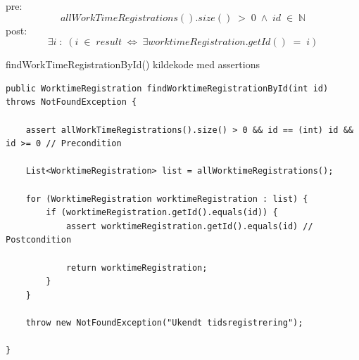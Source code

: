 pre: 
\begin{equation}
    allWorkTimeRegistrations().size()\; >\; 0 \;\wedge\; id \; \in \; \mathbb{N}
\end{equation}
post: 
\begin{equation}
    \exists i\; :\; (i\; \in\; result\; \iff\; \exists worktimeRegistration.getId() \; = \; i)
\end{equation}

\begin{listing}[H]
    \centering
    \caption{findWorkTimeRegistrationById() kildekode med assertions}\label{lst:find_work_time_registration_by_id_assertions}
    \begin{verbatim}
public WorktimeRegistration findWorktimeRegistrationById(int id) throws NotFoundException {

    assert allWorkTimeRegistrations().size() > 0 && id == (int) id && id >= 0 // Precondition
    
    List<WorktimeRegistration> list = allWorktimeRegistrations();

    for (WorktimeRegistration worktimeRegistration : list) {
        if (worktimeRegistration.getId().equals(id)) {
            assert worktimeRegistration.getId().equals(id) // Postcondition
            
            return worktimeRegistration;
        }
    }

    throw new NotFoundException("Ukendt tidsregistrering");

}
    \end{verbatim}
\end{listing}


